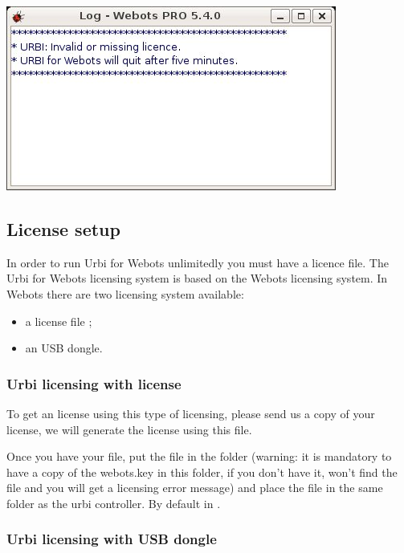 \begin{center}
  \includegraphics{img/webots/no-license-webots-log-msg}
\end{center}


\subsection{License setup}
\label{webots.license}%

In order to run Urbi for Webots unlimitedly you must have a licence
file.  The Urbi for Webots licensing system is based on the Webots
licensing system.  In Webots there are two licensing system available:
\begin{itemize}
\item a license file ;
\item an USB dongle.
\end{itemize}

\subsubsection{Urbi licensing with  license}
\label{webots.license.webotskey}%

To get an \urbi license using this type of licensing, please send us a
copy of your  license, we will generate the \urbi
license using this file.

Once you have your  file, put the 
file in the folder  (warning: it is mandatory
to have a copy of the webots.key in this folder, if you don't have it,
\urbi won't find the  file and you will get a
licensing error message) and place the  file in the
same folder as the urbi controller. By default in
.


\subsubsection{Urbi licensing with USB dongle}
\label{webots.license.dongleusb}%

